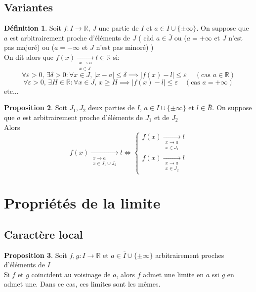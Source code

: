 \documentclass[10pt,a4paper]{article}
\theoremstyle{definition}
\newtheorem{proposition}{Proposition}[section]
\newtheorem{definition}[proposition]{Définition}
\begin{document}
\pagebreak

\subsection{Variantes}
\begin{definition}
Soit $f: I \to \mathbb{R}$, $J$ une partie de $I$ et $a \in \overline{I} \cup \{ \pm\infty \}$. On suppose que $a$ est arbitrairement proche d'éléments de $J$ ( càd $a \in \overline{J}$ ou ($a = +\infty$ et $J$ n'est pas majoré) ou ($a = -\infty$ et $J$ n'est pas minoré) ) \\
On dit alors que $f(x) \xrightarrow[\substack{x \to a \\ x \in J}]{} l \in \mathbb{R}$ si:
\[\forall \varepsilon > 0, \, \exists \delta > 0: \forall x \in J, \, |x - a| \leq \delta \implies |f(x) - l| \leq \varepsilon\ \quad (\text{cas } a \in \mathbb{R})\]
\[\forall \varepsilon > 0, \, \exists H \in \mathbb{R}: \forall x \in J, \, x \geq H \implies |f(x) - l| \leq \varepsilon \quad (\text{cas } a = +\infty)\]
etc...
\end{definition}
\begin{proposition}
Soit $J_1, J_2$ deux parties de $I$, $a \in I \cup \{ \pm\infty \}$ et $l \in \overline{R}$. On suppose que $a$ est arbitrairement proche d'éléments de $J_1$ et de $J_2$ \\
Alors
\[ f(x) \xrightarrow[\substack{x \to a \\ x \in J_1 \cup J_2}]{} l \iff \begin{cases}
f(x) \xrightarrow[\substack{x \to a \\ x \in J_1}]{} l \\ f(x) \xrightarrow[\substack{x \to a \\ x \in J_2}]{} l \end{cases}\]
\end{proposition}

\section{Propriétés de la limite}
\subsection{Caractère local}
\begin{proposition}
Soit $f, g: I \to \mathbb{R}$ et $a \in \overline{I} \cup \{ \pm\infty \}$ arbitrairement proches d'éléments de $I$ \\
Si $f$ et $g$ coïncident au voisinage de $a$, alors $f$ admet une limite en $a$ ssi $g$ en admet une. Dans ce cas, ces limites sont les mêmes.
\end{proposition}
\end{document}
